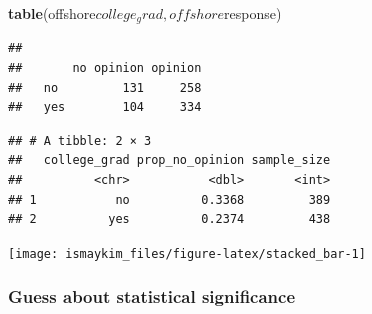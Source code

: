 \documentclass[]{tufte-book}
\newenvironment{Shaded}{\begin{snugshade}}{\end{snugshade}}
\newcommand{\KeywordTok}[1]{\textcolor[rgb]{0.13,0.29,0.53}{\textbf{{#1}}}}
\newcommand{\DataTypeTok}[1]{\textcolor[rgb]{0.13,0.29,0.53}{{#1}}}
\newcommand{\StringTok}[1]{\textcolor[rgb]{0.31,0.60,0.02}{{#1}}}
\newcommand{\NormalTok}[1]{{#1}}
\theoremstyle{definition}
\theoremstyle{definition}
\theoremstyle{remark}
\begin{document}
\begin{Shaded}
\begin{Highlighting}[]
\KeywordTok{table}\NormalTok{(offshore$college_grad, offshore$response)}
\end{Highlighting}
\end{Shaded}

\begin{verbatim}
##      
##       no opinion opinion
##   no         131     258
##   yes        104     334
\end{verbatim}

\begin{Shaded}
\end{Shaded}

\begin{verbatim}
## # A tibble: 2 × 3
##   college_grad prop_no_opinion sample_size
##          <chr>           <dbl>       <int>
## 1           no          0.3368         389
## 2          yes          0.2374         438
\end{verbatim}

\begin{Shaded}
\end{Shaded}

\begin{center}\texttt{[image: ismaykim\_files/figure-latex/stacked\_bar-1]} \end{center}

\subsubsection{Guess about statistical
significance}\label{guess-about-statistical-significance-2}
\end{document}
